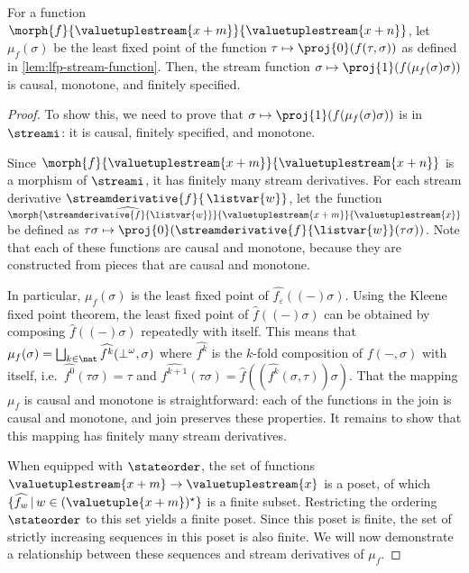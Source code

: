 \begin{theorem}
    For a function \(\morph{f}{\valuetuplestream{x+m}}{\valuetuplestream{x+n}}\),
    let \(\mu_f(\sigma)\) be the least fixed point of the function \(
    \tau \mapsto \proj{0}\mleft(f(\tau,\sigma)\mright)
    \) as defined in \cref{lem:lfp-stream-function}.
    Then, the stream function \(
    \sigma \mapsto \proj{1}\mleft(f(\mu_f(\sigma)\sigma)\mright)
    \) is causal, monotone, and finitely specified.
\end{theorem}
\begin{proof}
    To show this, we need to prove that
    \(\sigma \mapsto \proj{1}\mleft(f(\mu_f(\sigma)\sigma)\mright)\) is in
    \(\streami\): it is causal, finitely specified, and monotone.

    Since \(
    \morph{f}{\valuetuplestream{x+m}}{\valuetuplestream{x+n}}
    \) is a morphism of \(\streami\), it has finitely many stream derivatives.
    For each stream derivative \(\streamderivative{f}{\,\listvar{w}}\), let the
    function \(
    \morph{
        \widehat{\streamderivative{f}{\listvar{w}}}
    }{
        \valuetuplestream{x+m}
    }{
        \valuetuplestream{x}
    }
    \) be defined as \(
    \tau\sigma
    \mapsto
    \proj{0}(\streamderivative{f}{\listvar{w}}(\tau\sigma))
    \).
    Note that each of these functions are causal and monotone, because they are
    constructed from pieces that are causal and monotone.

    In particular, \(\mu_f(\sigma)\) is the least fixed point of
    \(\widehat{f_\varepsilon}\left((-)\sigma\right)\).
    Using the Kleene fixed point theorem, the least fixed point of
    \(\widehat{f}((-)\sigma)\) can be obtained by composing
    \(\widehat{f}((-)\sigma)\) repeatedly with itself.
    This means that \(
    \mu_f(\sigma)
    =
    \bigsqcup_{k \in \nat} \widehat{f^k}(\bot^\omega,\sigma)
    \) where \(\widehat{f^k}\) is the \(k\)-fold composition of \(f(-,\sigma)\)
    with itself, i.e.\ \(\widehat{f^0}(\tau\sigma) = \tau\) and \(
    \widehat{f^{k+1}}(\tau\sigma)
    =
    \widehat{f}\left(\left(\widehat{f^{k}}(\sigma, \tau)\right)\sigma\right)
    \).
    That the mapping \(\mu_f\) is causal and monotone is
    straightforward: each of the functions in the join is causal and monotone,
    and join preserves these properties.
    It remains to show that this mapping has finitely many stream derivatives.

    When equipped with \(\stateorder\), the set of functions
    \(\valuetuplestream{x+m} \to \valuetuplestream{x}\)
    is a poset, of which
    \(\{\widehat{f_w} \,|\, w \in (\valuetuple{x+m})^\star\}\)
    is a finite subset.
    Restricting the ordering \(\stateorder\) to this set yields a finite poset.
    Since this poset is finite, the set of strictly increasing sequences in this
    poset is also finite.
    We will now demonstrate a relationship between these sequences and stream
    derivatives of \(\mu_f\).


\end{proof}
